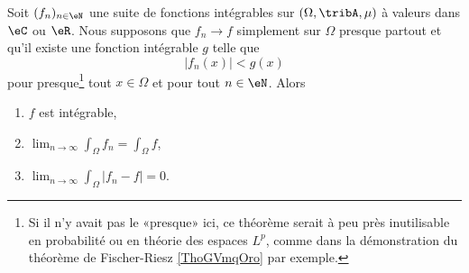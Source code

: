 \begin{theorem}        \label{ThoConvDomLebVdhsTf}
    Soit \( (f_n)_{n\in\eN}\) une suite de fonctions intégrables sur \( (\Omega,\tribA,\mu)\) à valeurs dans \( \eC\) ou \( \eR\). Nous supposons que  \( f_n\to f\) simplement sur \( \Omega\) presque partout et qu'il existe une fonction intégrable \( g\) telle que
    \begin{equation}
        | f_n(x) |< g(x) 
    \end{equation}
    pour presque\footnote{Si il n'y avait pas le «presque» ici, ce théorème serait à peu près inutilisable en probabilité ou en théorie des espaces \( L^p\), comme dans la démonstration du théorème de Fischer-Riesz \ref{ThoGVmqOro} par exemple.} tout \( x\in\Omega\) et pour tout \( n\in \eN\). Alors
    \begin{enumerate}
        \item
            \( f\) est intégrable,
        \item
           $\lim_{n\to \infty} \int_{\Omega}f_n=\int_\Omega f$,
        \item
            $\lim_{n\to \infty} \int_{\Omega}| f_n-f |=0$.
    \end{enumerate}
\end{theorem}

